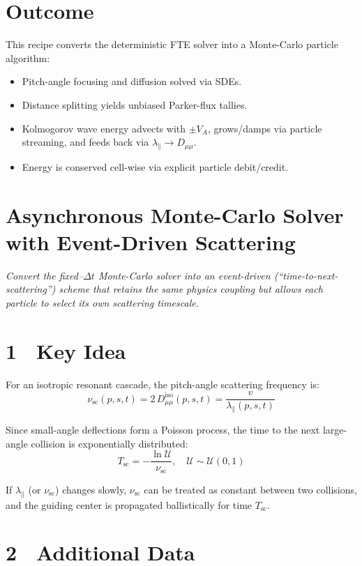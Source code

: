 {\section*{Outcome}

This recipe converts the deterministic FTE solver into a Monte-Carlo particle algorithm:
\begin{itemize}
    \item Pitch-angle focusing and diffusion solved via SDEs.
    \item Distance splitting yields unbiased Parker-flux tallies.
    \item Kolmogorov wave energy advects with $\pm V_A$, grows/damps via particle streaming, and feeds back via $\lambda_\parallel \rightarrow D_{\mu\mu}$.
    \item Energy is conserved cell-wise via explicit particle debit/credit.
\end{itemize}

\section*{Asynchronous Monte-Carlo Solver with Event-Driven Scattering}

\textit{Convert the fixed–$\Delta t$ Monte-Carlo solver into an event-driven (``time-to-next-scattering'') scheme that retains the same physics coupling but allows each particle to select its own scattering timescale.}

\section*{1 Key Idea}

For an isotropic resonant cascade, the pitch-angle scattering frequency is:
\[
\nu_{\text{sc}}(p,s,t) = 2\,D_{\mu\mu}^{\text{iso}}(p,s,t) = \frac{v}{\lambda_\parallel(p,s,t)}
\]

Since small-angle deflections form a Poisson process, the time to the next large-angle collision is exponentially distributed:
\[
\boxed{
T_{\text{sc}} = -\frac{\ln \mathcal{U}}{\nu_{\text{sc}}},\quad \mathcal{U} \sim \mathcal{U}(0,1)
}
\]

If $\lambda_\parallel$ (or $\nu_{\text{sc}}$) changes slowly, $\nu_{\text{sc}}$ can be treated as constant between two collisions, and the guiding center is propagated ballistically for time $T_{\text{sc}}$.

\section*{2 Additional Data}

}
